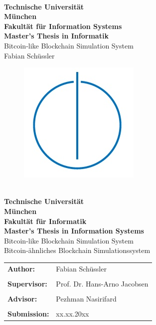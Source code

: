 \documentclass[12pt]{report}
\begin{document}
\hoffset=5mm
\thispagestyle{empty}
\begin{center}
	\bigskip \bigskip \bigskip 
	\oTUM{6.0cm} \\
	\vspace*{0.8cm}
	{\huge \bf Technische Universität} \\
	\bigskip
	{\huge \bf München} \\
	\bigskip \bigskip \bigskip
	{\huge \bf Fakultät für Information Systems} \\
	\bigskip \bigskip \bigskip
	{\Large \bf Master's Thesis in Informatik} \\
	\bigskip \bigskip \bigskip \bigskip \bigskip
	{\Large  Bitcoin-like Blockchain Simulation System} \\        
	\bigskip \bigskip \bigskip \bigskip
	{\Large Fabian Schüssler} \\    
	\bigskip
	\begin{figure}[ht]
	\centering \includegraphics[width=0.2\linewidth]{figures/infologo.jpg}
	\end{figure}
	\bigskip 
\end{center}
\vfill

\newpage
\hoffset=5mm
\thispagestyle{empty}
\begin{center}
	\bigskip \bigskip \bigskip 
	\oTUM{6.0cm} \\
	\vspace*{0.8cm}
	{\huge \bf Technische Universität} \\
	\bigskip
	{\huge \bf München} \\
	\bigskip \bigskip \bigskip
	{\huge \bf Fakultät für Informatik} \\
	\bigskip \bigskip \bigskip
	{\Large \bf Master's Thesis in Information Systems} \\
	\bigskip \bigskip \bigskip \bigskip \bigskip
	{\Large Bitcoin-like Blockchain Simulation System} \\
	\bigskip \bigskip \bigskip
	{\Large Bitcoin-ähnliches Blockchain Simulationssystem} \\
	\bigskip
\end{center}
\vfill
\begin{tabular}{ll}
{\Large \bf Author:} & {\Large Fabian Schüssler} \\\\
{\Large \bf Supervisor:} & {\Large Prof. Dr. Hans-Arno Jacobsen} \\\\
{\Large \bf Advisor:} & {\Large Pezhman Nasirifard} \\\\
{\Large \bf Submission:} & {\Large xx.xx.20xx}
\end{tabular}
\end{document}
